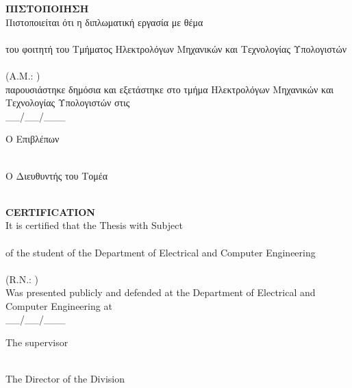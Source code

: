 \pagestyle{empty}
\begin{center}
{\LARGE \textbf{ΠΙΣΤΟΠΟΙΗΣΗ}\\[1cm]}
\large Πιστοποιείται ότι η διπλωματική εργασία με θέμα\\[1cm]
\textbf{\large \thesistitle }\\[1cm]
του φοιτητή του Τμήματος Ηλεκτρολόγων Μηχανικών και Τεχνολογίας Υπολογιστών\\[1.5cm]
\me \\[0.5cm]
(Α.Μ.: \studnum )\\[1.5cm]
παρουσιάστηκε δημόσια και εξετάστηκε στο τμήμα  Ηλεκτρολόγων Μηχανικών και Τεχνολογίας Υπολογιστών στις\\[1cm]
\Large{\_\_/\_\_/\_\_\_}\\[1.5cm]
\end{center}
\begin{minipage}{0.5\textwidth}
\begin{flushleft} \large
Ο Επιβλέπων\\[4cm]
\supname \\
\emph{\suptitle}
\end{flushleft}
\end{minipage}
\begin{minipage}{0.5\textwidth}
\begin{flushright} \large
Ο Διευθυντής του Τομέα\\[4cm]
\headofdivision\\
\emph{\headofdivisiontitle}
\end{flushright}
\end{minipage}

\newpage{\pagestyle{empty}\cleardoublepage}
\newpage
\pagestyle{empty}
\begin{center}
{\LARGE \textbf{CERTIFICATION}\\[1cm]}
\large It is certified that the Thesis with Subject\\[1cm]
\textbf{\large \thesistitle }\\[1cm]
of the student of the Department of Electrical and Computer Engineering\\[1.5cm]
\me \\[0.5cm]
(R.N.: \studnum )\\[1.5cm]
Was presented publicly and defended at the Department of Electrical and Computer Engineering at\\[1cm]
\Large{\_\_/\_\_/\_\_\_}\\[1.5cm]
\end{center}
\begin{minipage}{0.5\textwidth}
\begin{flushleft} \large
The supervisor\\[4cm]
\supname \\
\emph{\suptitle}
\end{flushleft}
\end{minipage}
\begin{minipage}{0.5\textwidth}
\begin{flushright} \large
The Director of the Division\\[4cm]
\headofdivision\\
\emph{\headofdivisiontitle}
\end{flushright}
\end{minipage}